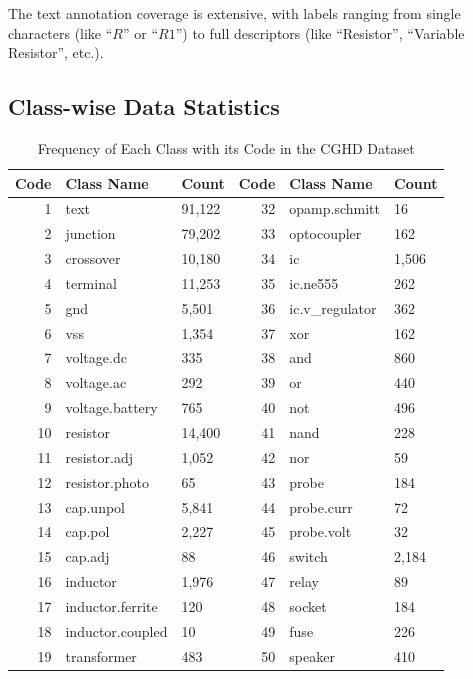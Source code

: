 The text annotation coverage is extensive, with labels ranging from single characters (like ``$R$'' or ``$R1$'') to full descriptors (like ``Resistor'', ``Variable Resistor'', etc.).

\subsection{Class-wise Data Statistics}

\begin{table}[H]
    \centering
    \caption{Frequency of Each Class with its Code in the CGHD Dataset}
    \label{table:cghd-classes}
    \begin{tabular}{rll|rll}
        \toprule
        \textbf{Code} & \textbf{Class Name} & \textbf{Count} & \textbf{Code} & \textbf{Class Name} & \textbf{Count} \\
        \midrule
        1 & text & 91,122 & 32 & opamp.schmitt & 16 \\
        2 & junction & 79,202 & 33 & optocoupler & 162 \\
        3 & crossover & 10,180 & 34 & ic & 1,506 \\
        4 & terminal & 11,253 & 35 & ic.ne555 & 262 \\
        5 & gnd & 5,501 & 36 & ic.v\_regulator & 362 \\
        6 & vss & 1,354 & 37 & xor & 162 \\
        7 & voltage.dc & 335 & 38 & and & 860 \\
        8 & voltage.ac & 292 & 39 & or & 440 \\
        9 & voltage.battery & 765 & 40 & not & 496 \\
        10 & resistor & 14,400 & 41 & nand & 228 \\
        11 & resistor.adj & 1,052 & 42 & nor & 59 \\
        12 & resistor.photo & 65 & 43 & probe & 184 \\
        13 & cap.unpol & 5,841 & 44 & probe.curr & 72 \\
        14 & cap.pol & 2,227 & 45 & probe.volt & 32 \\
        15 & cap.adj & 88 & 46 & switch & 2,184 \\
        16 & inductor & 1,976 & 47 & relay & 89 \\
        17 & inductor.ferrite & 120 & 48 & socket & 184 \\
        18 & inductor.coupled & 10 & 49 & fuse & 226 \\
        19 & transformer & 483 & 50 & speaker & 410 \\

\end{tabular}
\end{table}

